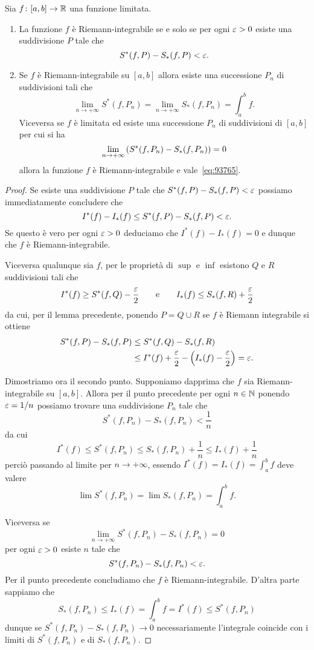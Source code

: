 \begin{theorem}
\label{th:criteri_integrabilita}
\mymark{*}
Sia $f\colon[a,b]\to \mathbb R$ una funzione limitata.
\begin{enumerate}
\item
La funzione $f$ è Riemann-integrabile se e solo se
per ogni $\varepsilon>0$ esiste una suddivisione $P$
tale che
\[
  S^*(f,P) - S_*(f,P) < \varepsilon.
\]

\item
Se $f$ è Riemann-integrabile su $[a,b]$ allora
esiste una successione $P_n$ di suddivisioni tali che
\begin{equation}\label{eq:93765}
  \lim_{n\to +\infty} S^*(f,P_n)
  = \lim_{n\to+\infty} S_*(f,P_n)
  = \int_a^b f.
\end{equation}
Viceversa se $f$ è limitata ed esiste una successione $P_n$ 
di suddivisioni di $[a,b]$ per cui si ha
\begin{equation*}
  \lim_{n\to +\infty} {\left( S^*(f,P_n) - S_*(f,P_n) \right)} = 0
\end{equation*}
allora la funzione $f$ è Riemann-integrabile e vale~\eqref{eq:93765}.
\end{enumerate}
\end{theorem}
%
\begin{proof}
Se esiste una suddivisione $P$ tale che $S^*(f,P)-S_*(f,P) < \varepsilon$ possiamo immediatamente concludere che
\[
I^*(f) - I_*(f) \le S^*(f,P) - S_*(f,P) < \varepsilon.
\]
Se questo è vero per ogni $\varepsilon >0$ deduciamo che $I^*(f) - I_*(f) = 0$ e dunque che $f$ è Riemann-integrabile.

Viceversa qualunque sia $f$, per le proprietà
di $\sup$ e $\inf$
esistono $Q$ e $R$ suddivisioni tali che
\[
  I^*(f) \ge S^*(f,Q) - \frac{\varepsilon} 2
  \qquad\text{e}\qquad
  I_*(f) \le S_*(f,R) + \frac{\varepsilon} 2
\]
da cui, per il lemma precedente, ponendo $P=Q\cup R$
se $f$ è Riemann integrabile
si ottiene
\begin{align*}
S^*(f,P)-S_*(f,P) &\le S^*(f,Q) - S_*(f,R) \\
&\le I^*(f) + \frac{\varepsilon} 2 - {\left( I_*(f) - \frac {\varepsilon} 2 \right)} = \varepsilon.
\end{align*}

Dimostriamo ora il secondo punto.
Supponiamo dapprima che $f$ sia Riemann-integrabile su $[a,b]$.
Allora per il punto precedente per ogni $n\in \mathbb N$ ponendo $\varepsilon=1/n$ possiamo trovare una suddivisione $P_n$ tale che
\[
  S^*(f,P_n) - S_*(f,P_n) < \frac 1 n
\]
da cui
\[
  I^*(f) \le S^*(f,P_n) \le S_*(f,P_n) + \frac 1 n
   \le I_*(f) + \frac 1 n
\]
perciò passando al limite per $n\to +\infty$,
essendo $I^*(f) = I_*(f) = \int_a^b f$ deve valere
\[
  \lim S^*(f,P_n) = \lim S_*(f,P_n) = \int_a^b f.
\]

Viceversa se
\[
 \lim_{n\to +\infty} S^*(f,P_n) - S_*(f,P_n) = 0
\]
per ogni $\varepsilon>0$ esiste $n$ tale che
\[
  S^*(f,P_n) - S_*(f,P_n) < \varepsilon.
\]
Per il punto precedente concludiamo che $f$ è Riemann-integrabile.
D'altra parte sappiamo che
\[
  S_*(f,P_n) \le I_*(f) = \int_a^b f = I^*(f) \le S^*(f,P_n)
\]
dunque se $S^*(f,P_n) - S_*(f,P_n) \to 0$ necessariamente
l'integrale coincide con i limiti di $S^*(f,P_n)$ e di
$S_*(f,P_n)$.
\end{proof}

